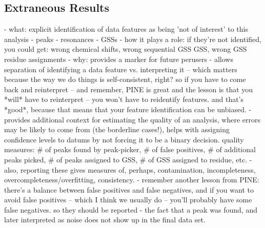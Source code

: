 \subsection{Extraneous Results}
 - what: explicit identification of data features as being 'not of interest'
   to this analysis
   - peaks
   - resonances
   - GSSs
 - how it plays a role: if they're not identified, you could get: wrong 
   chemical shifts, wrong sequential GSS GSS, wrong GSS residue assignments
 - why: provides a marker for future perusers
 - allows separation of identifying a data feature vs. interpreting it -- which
   matters because the way we do things is self-consistent, right?  
   so if you have to come back and reinterpret -- and remember, PINE is great and the
   lesson is that you *will* have to reinterpret -- you won't have to reidentify
   features.  
   and that's *good*, because that means that your feature identification
   can be unbiased.  
 - provides additional context for estimating the quality of an analysis,
   where errors may be likely to come from (the borderline cases!), helps with
   assigning confidence levels to datums by not forcing it to be a binary 
   decision.  quality measures: \# of peaks found by peak-picker, \# of false
   positives, \# of additional peaks picked, \# of peaks assigned to GSS, 
   \# of GSS assigned to residue, etc.
 - also, reporting these gives measures of, perhaps, contamination,
   incompleteness, overcompleteness/overfitting, consistency.  
 - remember another
   lesson from PINE: there's a balance between false positives and false negatives,
   and if you want to avoid false positives -- which I think we usually do -- 
   you'll probably have some false negatives.  so they should be reported
 - the fact that a peak was found, and later interpreted as noise does 
   not show up in the final data set.

